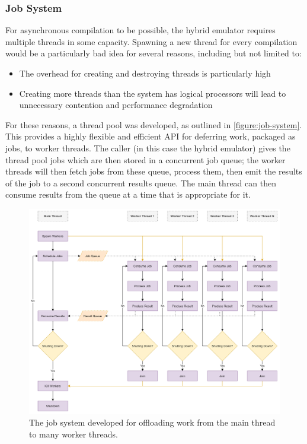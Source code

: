 \subsubsection{Job System}

For asynchronous compilation to be possible, the hybrid emulator requires multiple threads in some capacity. Spawning a new thread for every compilation would be a particularly bad idea for several reasons, including but not limited to:

\begin{itemize}
    \item The overhead for creating and destroying threads is particularly high
    \item Creating more threads than the system has logical processors will lead to unnecessary contention and performance degradation
\end{itemize}

For these reasons, a thread pool was developed, as outlined in \autoref{figure:job-system}. This provides a highly flexible and efficient API for deferring work, packaged as jobs, to worker threads. The caller (in this case the hybrid emulator) gives the thread pool jobs which are then stored in a concurrent job queue; the worker threads will then fetch jobs from these queue, process them, then emit the results of the job to a second concurrent results queue. The main thread can then consume results from the queue at a time that is appropriate for it.

\begin{figure}[h]
    \centering
    \includegraphics[width=1\linewidth]{diagrams/thread-pool.png}
    \caption{The job system developed for offloading work from the main thread to many worker threads.}
    \label{figure:job-system}
\end{figure}

